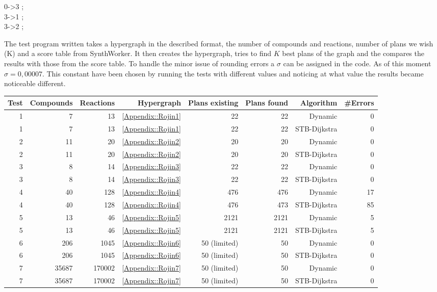 \documentclass[a4paper,10pt,titlepage]{paper}
\begin{document}
\begin{center}
0->3 ;\\
3->1 ;\\
3->2 ;\\
\end{center}
The test program written takes a hypergraph in the described format, the number of compounds and reactions, number of plans we wish (K) and a score table from SynthWorker. It then creates the hypergraph, tries to find $K$ best plans of the graph and the compares the results with those from the score table. To handle the minor issue of rounding errors a $\sigma$ can be assigned in the code. As of this moment $\sigma = 0,00007$. This constant have been chosen by running the tests with different values and noticing at what value the results became noticeable different.\\

\begin{table}[H]
\hspace{-2.5cm}
\begin{tabular}{|r|r|r|r|r|r|r|r|}
\hline
Test & Compounds & Reactions & Hypergraph & Plans existing & Plans found & Algorithm & \#Errors\\\hline
1 & 7 & 13 & \ref{Appendix::Rojin1} & 22 & 22 & Dynamic & 0\\\hline
1 & 7 & 13 & \ref{Appendix::Rojin1} & 22 & 22 & STB-Dijkstra & 0\\\hline
2 & 11 & 20 & \ref{Appendix::Rojin2}  & 20 & 20 & Dynamic & 0\\\hline
2 & 11 & 20 & \ref{Appendix::Rojin2} & 20 & 20 & STB-Dijkstra & 0\\\hline
3 & 8 & 14 & \ref{Appendix::Rojin3} & 22 & 22 & Dynamic & 0\\\hline
3 & 8 & 14 & \ref{Appendix::Rojin3} & 22 & 22 & STB-Dijkstra & 0\\\hline
4 & 40 & 128 & \ref{Appendix::Rojin4} & 476 & 476 & Dynamic & 17\\\hline
4 & 40 & 128 & \ref{Appendix::Rojin4} & 476 & 473 & STB-Dijkstra & 85\\\hline
5 & 13 & 46 & \ref{Appendix::Rojin5} & 2121 & 2121 & Dynamic & 5\\\hline
5 & 13 & 46 & \ref{Appendix::Rojin5} & 2121 & 2121 & STB-Dijkstra & 5\\\hline
6 & 206 & 1045 & \ref{Appendix::Rojin6} & 50 (limited) & 50 & Dynamic & 0 \\\hline
6 & 206 & 1045 & \ref{Appendix::Rojin6} & 50 (limited) & 50 & STB-Dijkstra & 0 \\\hline
7 & 35687 & 170002 & \ref{Appendix::Rojin7} & 50 (limited) & 50 & Dynamic & 0 \\\hline
7 & 35687 & 170002 & \ref{Appendix::Rojin7} & 50 (limited) & 50 & STB-Dijkstra & 0 \\\hline
\end{tabular}
\end{table}
\end{document}
